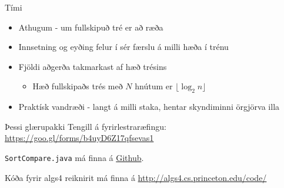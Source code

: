 \documentclass{beamer}
\begin{document}
\begin{frame}{Tími}
\begin{itemize}
 \item Athugum - um fullskipuð tré er að ræða
 \item Innsetning og eyðing felur í sér færslu á milli hæða í trénu
 \item Fjöldi aðgerða takmarkast af hæð trésins
 \begin{itemize}
  \item Hæð fullskipaðs trés með $N$ hnútum er $\lfloor \log_2 n \rfloor$
 \end{itemize}
 \item Praktísk vandræði - langt á milli staka, hentar skyndiminni örgjörva illa
\end{itemize}
\end{frame}

\begin{frame}{Þessi glærupakki}
Tengill á fyrirlestraræfingu: \url{https://goo.gl/forms/b4uyD6Z17qfsevas1}
\vspace{1cm}

\texttt{SortCompare.java} má finna á \href{https://github.com/Ernir/kennsluefni/tree/master/T2/Code/w7}{Github}. 

Kóða fyrir algs4 reiknirit má finna á \url{http://algs4.cs.princeton.edu/code/}
\end{frame}
\end{document}
